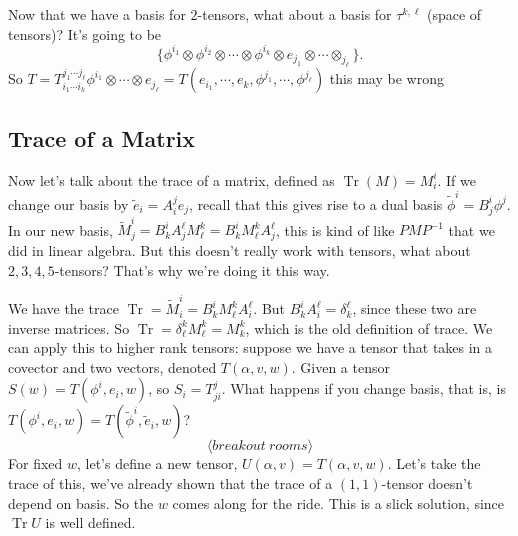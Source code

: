 Now that we have a basis for $2$-tensors, what about a basis for $\tau ^{k,\ell}$ (space of tensors)? It's going to be \[
\{\phi ^{i_1}\otimes \phi ^{i_2}\otimes \cdots \otimes \phi ^{i_k}\otimes e_{j_1}\otimes \cdots \otimes _{j_{\ell}}\} .
\] So $T=T_{i_1\cdots i_k}^{j_1\cdots j_{\ell}}\phi ^{i_1}\otimes \cdots \otimes e_{j_{\ell}}=T(e_{i_1},\cdots, e_{k}, \phi^{j_1},\cdots ,\phi ^{j_{\ell}})$ {\color{red} this may be wrong}

\subsection{Trace of a Matrix}
Now let's talk about the trace of a matrix, defined as $\operatorname{Tr}(M)=M^i _i $. If we change our basis by $\widetilde e_i =A_i^j e_j $, recall that this gives rise to a dual basis $\widetilde \phi ^i =B_j ^i  \phi^j $. In our new basis, $\widetilde M^i _j =B^i _k A_j ^{\ell}M^k_{\ell}=B^i _k M^k _{\ell}A^{\ell}_j $, this is kind of like $PMP ^{-1}$ that we did in linear algebra. But this doesn't really work with tensors, what about $2,3,4,5$-tensors? That's why we're doing it this way.

We have the trace $\operatorname{Tr}=\widetilde M_i ^i =B^i _k M^k_{\ell}A_i ^{\ell}$. But $B^i _k A_i ^{\ell}=\delta ^{\ell}_k$, since these two are inverse matrices. So $\operatorname{Tr}=\delta _{\ell}^k M^k_{\ell}=M_k^k$, which is the old definition of trace. We can apply this to higher rank tensors: suppose we have a tensor that takes in a covector and two vectors, denoted $T(\alpha ,v,w)$. Given a tensor $S(w)=T(\phi ^i , e_i, w)$, so $S_i =T^j  _{ji}$. What happens if you change basis, that is, is $T(\phi ^i , e_i , w)=T( \widetilde \phi ^i , \widetilde e_i , w)$?
\[
\langle breakout \ rooms \rangle 
\] For fixed $w$, let's define a new tensor, $U(\alpha ,v)=T(\alpha ,v,w)$. Let's take the trace of this, we've already shown that the trace of a $(1,1)$-tensor doesn't depend on basis. So the $w$ comes along for the ride. This is a slick solution, since $\operatorname{Tr}U$ is well defined.

